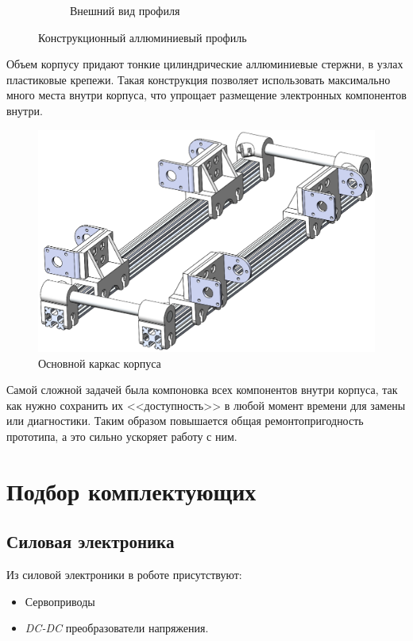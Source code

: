 \begin{figure}[ht]
\begin{subfigure}[b]{0.45\textwidth}
        \caption{Внешний вид профиля}
    \end{subfigure}
     
    \caption{Конструкционный аллюминиевый профиль}
    \label{}
\end{figure}

Объем корпусу придают тонкие цилиндрические аллюминиевые стержни, в узлах пластиковые крепежи. Такая конструкция позволяет использовать максимально много места внутри корпуса, что упрощает размещение электронных компонентов внутри.

\begin{figure}[h]
    \centering
    \includegraphics[scale=0.6]{chapter_mechanics_construction/figure10.png}
    \caption{Основной каркас корпуса}
    \label{}
\end{figure}

Самой сложной задачей была компоновка всех компонентов внутри корпуса, так как нужно сохранить их <<доступность>> в любой момент времени для замены или диагностики. Таким образом повышается общая ремонтопригодность прототипа, а это сильно ускоряет работу с ним.

\section{Подбор комплектующих}
\subsection{Силовая электроника}
Из силовой электроники в роботе присутствуют:
\begin{itemize}
    \item Сервоприводы
    \item \textit{DC-DC} преобразователи напряжения.
\end{itemize}


